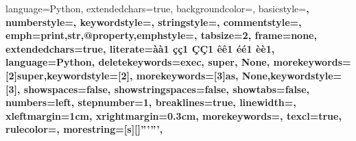 {%
 language=Python,                                       %
 extendedchars=true,                                    %
 backgroundcolor=\color{LBluePy},                    %
 basicstyle=\color{black}\fontsize{9}{9}\selectfont\ttfamily\bfseries,
 numberstyle=\color{BluePy}\fontsize{8}{8}\selectfont\ttfamily,   
 keywordstyle=\color{Orange}\ttfamily\bfseries,         %
 stringstyle=\color{DarkGreen}\ttfamily\bfseries,       %
 commentstyle=\color{red}\ttfamily,                     %
 emph={print,str,@property},emphstyle=\color{Mauve}\ttfamily\bfseries,
 tabsize=2,                                             %
 frame=none,                                          %
 extendedchars=true,                                    %
 literate={à}{{\`a}}1 {ç}{{\c{c}}}1 {Ç}{{\c{C}}}1 {ê}{{\^e}}1 {é}{{\'e}}1 {è}{{\`e}}1,
 language=Python,                                 %
 deletekeywords={exec, super, None},                               %
 morekeywords={[2]super},keywordstyle={[2]\bfseries\Mauve},
 morekeywords={[3]as, None},keywordstyle={[3]\bfseries\Orange},
 showspaces=false,                                      %
 showstringspaces=false,                                %
 showtabs=false,                                        %
 numbers=left,                                          %
 stepnumber=1,                                          %
 breaklines=true,                                       %
 linewidth=\linewidth,                                  %
 xleftmargin=1cm,                                       %
 xrightmargin=0.3cm,                                      %
 morekeywords={},                                        %
 texcl=true,
 rulecolor=\color{BluePy},
 morestring=[s][\color{DarkGreen}]{'''}{'''},
 }


